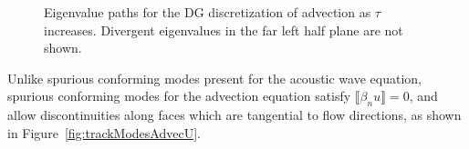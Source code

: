 \documentclass[10pt]{article}
\newcommand{\jump}[1] {\ensuremath{\llbracket#1\rrbracket}}
\newcommand{\note}[1]{{\color{blue}#1}}
\begin{document}
\begin{figure}
\centering
{}
\hspace{.5em}
\caption{Eigenvalue paths for the DG discretization of advection as $\tau$ increases.  Divergent eigenvalues in the far left half plane are not shown.  }
\label{fig:trackModesAdvec}
\end{figure}

Unlike spurious conforming modes present for the acoustic wave equation, spurious conforming modes for the advection equation satisfy $\jump{\beta_n u} = 0$, and allow discontinuities along faces which are tangential to flow directions, as shown in Figure~\ref{fig:trackModesAdvecU}.  %
\end{document}
